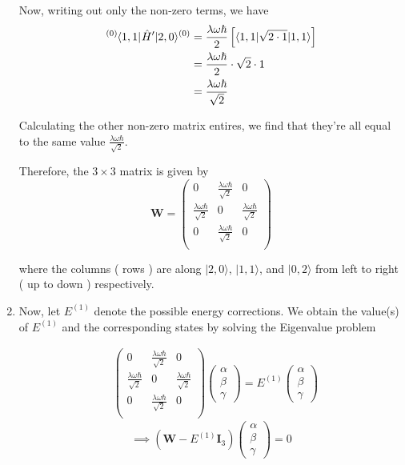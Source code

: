 \documentclass{article}
\newcommand{\ket}[1]{|#1 \rangle}
\newcommand{\bra}[1]{\langle #1|}
\newcommand{\inner}[2]{\langle #1 | #2 \rangle}
\begin{document}
\begin{enumerate}[label=(\alph*)]
  Now, writing out only the non-zero terms, we have
  \begin{align*}
    \tensor[^{(0)}]{\bra{1,1}}{}\hat{H}'\ket{2,0}^{(0)} &= \frac{\lambda \omega 
    \hbar }{2} \left[ \inner{1,1}{\sqrt{2 \cdot 1}|1,1}  \right] \\
    &= \frac{\lambda \omega \hbar}{2} \cdot \sqrt{2} \cdot 1 \\
    &= \frac{\lambda \omega \hbar}{\sqrt{2}}\\
  \end{align*}

  Calculating the other non-zero matrix entires, we find that they're all equal to the same value $\frac{\lambda \omega \hbar}{\sqrt{2}}$.

  Therefore, the $3 \times 3$ matrix is given by 
  \[ \mathbf{W} = \begin{pmatrix}
    0 & \frac{\lambda \omega \hbar}{\sqrt{2}} & 0 \\
    \frac{\lambda \omega \hbar}{\sqrt{2}} & 0 & \frac{\lambda \omega \hbar}{\sqrt{2}} \\
    0 & \frac{\lambda \omega \hbar}{\sqrt{2}} & 0 \\
  \end{pmatrix} \]

  where the columns ( rows ) are along $\ket{2,0}$, $\ket{1,1}$, and $\ket{0,2}$ from left to right ( up to down ) respectively.

  \vskip 0.5cm
  \item Now, let $E^{(1)}$ denote the possible energy corrections. We obtain the value(s) of $E^{(1)}$ and the corresponding states by solving the Eigenvalue problem

  \begin{align*}
    &\begin{pmatrix}
      0 & \frac{\lambda \omega \hbar}{\sqrt{2}} & 0 \\
      \frac{\lambda \omega \hbar}{\sqrt{2}} & 0 & \frac{\lambda \omega \hbar}{\sqrt{2}} \\
      0 & \frac{\lambda \omega \hbar}{\sqrt{2}} & 0 \\
    \end{pmatrix} \begin{pmatrix}
      \alpha \\
      \beta \\
      \gamma 
    \end{pmatrix} = E^{(1)} \begin{pmatrix}
      \alpha \\
      \beta \\
      \gamma 
    \end{pmatrix} 
  \end{align*}
  \[ \implies \left(\mathbf{W} - E^{(1)} \mathbf{I}_{3}\right)\begin{pmatrix}
    \alpha \\
    \beta \\
    \gamma 
  \end{pmatrix} =  0 \]


\end{enumerate}
\end{document}
